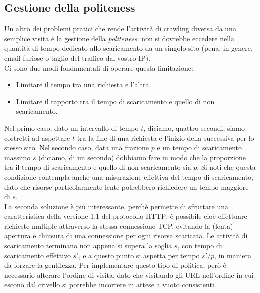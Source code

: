 \subsection{Gestione della politeness}
Un altro dei problemi pratici che rende l'attività di crawling diversa da una semplice visita è la gestione della \textit{politeness}: non si dovrebbe eccedere nella quantità di tempo dedicato allo scaricamento da un singolo sito (pena, in genere, email furiose o taglio del traffico dal vostro IP).\\
Ci sono due modi fondamentali di operare questa limitazione:
\begin{itemize}
    \item Limitare il tempo tra una richiesta e l'altra.
    \item Limitare il rapporto tra il tempo di scaricamento e quello di non scaricamento.
\end{itemize}
Nel primo caso, dato un intervallo di tempo $t$, diciamo, quattro secondi, siamo costretti ad aspettare $t$ tra la fine di una richiesta e l'inizio della successiva per lo stesso sito. Nel secondo caso, data una frazione $p$ e un tempo di scaricamento massimo $s$ (diciamo, di un secondo) dobbiamo fare in modo che la proporzione tra il tempo di scaricamento e quello di non-scaricamento sia $p$. Si noti che questa condizione contempla anche una misurazione effettiva del tempo di scaricamento, dato che risorse particolarmente lente potrebbero richiedere un tempo maggiore di $s$.\\
La seconda soluzione è più interessante, perchè permette di sfruttare una caratteristica della versione 1.1 del protocollo HTTP: è possibile cioè effettuare richieste multiple attraverso la stessa connessione TCP, evitando la (lenta) apertura e chiusura di una connessione per ogni risorsa scaricata. Le attività di scaricamento terminano non appena si supera la soglia $s$, con tempo di scaricamento effettivo $s'$, e a questo punto si aspetta per tempo $s'/p$, in maniera da forzare la gentilezza.
Per implementare questo tipo di politica, però è necessario alterare l'ordine di visita, dato che visitando gli URL nell'ordine in cui escono dal crivello si potrebbe incorrere in attese a vuoto consistenti.
